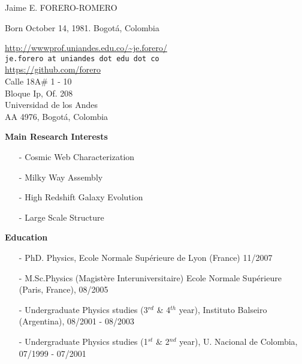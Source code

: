 \documentclass[letterpaper,11pt,onecolumn]{article}
\begin{document}
\noindent

\noindent
{{\Large Jaime E. FORERO-ROMERO}}\\
\begin{flushleft}
Born October 14, 1981. Bogot\'a, Colombia\\
\end{flushleft}
\begin{flushright}
\url{http://wwwprof.uniandes.edu.co/~je.forero/} \\{\tt{je.forero at uniandes dot edu dot co}}\\
\url{https://github.com/forero}\\
Calle 18A\# 1 - 10\\
Bloque Ip, Of. 208\\
Universidad de los Andes\\
AA 4976, Bogot\'a, Colombia\\
\end{flushright}


{\bf Main Research Interests}
\begin{itemize}
\item[-]{Cosmic Web Characterization}
\item[-]{Milky Way Assembly}
\item[-]{High Redshift Galaxy Evolution}
\item[-]{Large Scale Structure}
\end{itemize}

{\bf Education}
\indent
\begin{itemize}
\item[-] PhD. Physics, Ecole Normale Sup\'erieure de Lyon (France) 11/2007
\item[-] M.Sc.Physics (Magist\`ere Interuniversitaire)  Ecole Normale
  Sup\'erieure (Paris, France), 08/2005
\item[-] Undergraduate Physics studies (3$^{rd}$ \& 4$^{th}$ year),
  Instituto Balseiro (Argentina), 08/2001 - 08/2003
\item[-] Undergraduate Physics studies (1$^{st}$ \& 2$^{nd}$ year),
  U. Nacional de Colombia, 07/1999 -  07/2001
\end{itemize}
\end{document}
